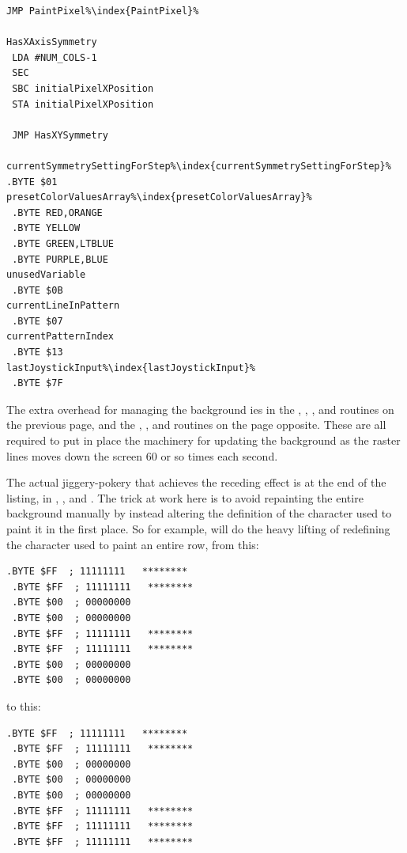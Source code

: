 \begin{minipage}[b]{0.33\linewidth}
\begin{lrbox}{\mybox}
\begin{lstlisting}[basicstyle=\ttfamily\tiny,escapechar=\%]
 JMP PaintPixel%\index{PaintPixel}%

HasXAxisSymmetry   
 LDA #NUM_COLS-1
 SEC 
 SBC initialPixelXPosition
 STA initialPixelXPosition

 JMP HasXYSymmetry

currentSymmetrySettingForStep%\index{currentSymmetrySettingForStep}%
.BYTE $01
presetColorValuesArray%\index{presetColorValuesArray}%        
 .BYTE RED,ORANGE
 .BYTE YELLOW
 .BYTE GREEN,LTBLUE
 .BYTE PURPLE,BLUE
unusedVariable                
 .BYTE $0B
currentLineInPattern          
 .BYTE $07
currentPatternIndex           
 .BYTE $13
lastJoystickInput%\index{lastJoystickInput}%
 .BYTE $7F

\end{lstlisting}
\end{lrbox}%
\scalebox{0.8}{\usebox{\mybox}}
\end{minipage}
The extra overhead for managing the background ies in the , , , and
 routines on the previous page, and the , , and
 routines on the page opposite. These are all required to put in place the machinery for updating the background as the raster
lines moves down the screen 60 or so times each second. 

The actual jiggery-pokery that achieves the receding effect is at the end of the listing, in , ,
and . The trick at work here is to avoid repainting the entire background manually by instead altering the definition of the character
used to paint it in the first place. So for example,  will do the heavy lifting of redefining the character used to paint an entire row,
from this:
\begin{lstlisting}[escapechar=\%]
 .BYTE $FF  ; 11111111   ********
 .BYTE $FF  ; 11111111   ********
 .BYTE $00  ; 00000000           
 .BYTE $00  ; 00000000           
 .BYTE $FF  ; 11111111   ********
 .BYTE $FF  ; 11111111   ********
 .BYTE $00  ; 00000000           
 .BYTE $00  ; 00000000           
\end{lstlisting}
to this:
\begin{lstlisting}[escapechar=\%]
 .BYTE $FF  ; 11111111   ********
 .BYTE $FF  ; 11111111   ********
 .BYTE $00  ; 00000000           
 .BYTE $00  ; 00000000           
 .BYTE $00  ; 00000000           
 .BYTE $FF  ; 11111111   ********
 .BYTE $FF  ; 11111111   ********
 .BYTE $FF  ; 11111111   ********
\end{lstlisting}


